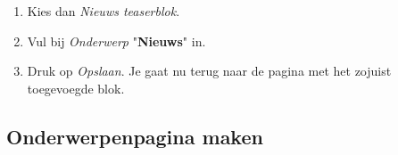 \begin{enumerate}
\begin{center}
\end{center}
\item Kies dan \emph{Nieuws teaserblok}.
\begin{center}
\end{center}
\item Vul bij \emph{Onderwerp} "\textbf{Nieuws}" in.
\item Druk op \emph{Opslaan}. Je gaat nu terug naar de pagina met het zojuist toegevoegde blok.
\end{enumerate}

\subsection{Onderwerpenpagina maken}

